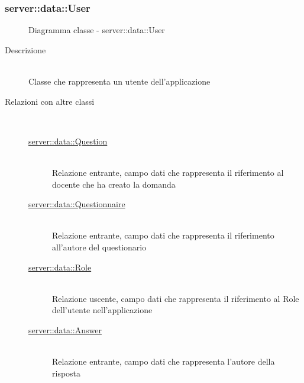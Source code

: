 \vspace{0.5cm}
\hypertarget{server::data::User}{}
\subsubsection[User]{server::data::User}
\begin{figure}[H]
	\centering
	\caption{Diagramma classe - server::data::User}
\end{figure}\begin{description}
\item[Descrizione] \hfill \\
Classe che rappresenta un utente dell'applicazione
\item[Relazioni con altre classi] \hfill \\
\vspace{-7mm}
\begin{description}
	\item[\hyperlink{server::data::Question}{server::data::Question}] \hfill \\
	Relazione entrante, campo dati che rappresenta il riferimento al docente che ha creato la domanda
	\item[\hyperlink{server::data::Questionnaire}{server::data::Questionnaire}] \hfill \\
	Relazione entrante, campo dati che rappresenta il riferimento all'autore del questionario
	\item[\hyperlink{server::data::Role}{server::data::Role}] \hfill \\
	Relazione uscente, campo dati che rappresenta il riferimento al Role dell'utente nell'applicazione
	\item[\hyperlink{server::data::Answer}{server::data::Answer}] \hfill \\
	Relazione entrante, campo dati che rappresenta l'autore della risposta
\end{description}


\end{description}
